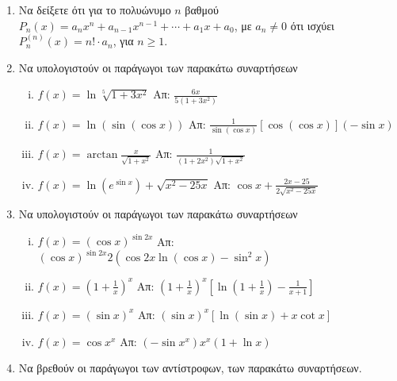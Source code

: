 \begin{enumerate}
  \item Να δείξετε ότι για το πολυώνυμο $n$ βαθμού $ P_{n}(x) =a_{n}x^{n} +
    a_{n-1}x^{n-1} + \cdots + a_{1}x + a_{0} $, με  $ a_{n}\neq 0 $ ότι ισχύει $
    P_{n}^{(n)}(x) = n! \cdot a_{n}$, για  $n\geq 1 $.

  \item Να υπολογιστούν οι παράγωγοι των παρακάτω συναρτήσεων
    \begin{enumerate}[(i)]
      \item $ f(x) = \ln{\sqrt[5]{1+3x^{2}}} $ \hfill Απ: $
        \frac{6x}{5(1+3x^{2})} $
      \item $ f(x) = \ln({\sin({\cos{x}})}) $ \hfill Απ: $
        \frac{1}{\sin{(\cos{x})}} [\cos{(\cos{x})}] (- \sin{x}) $ 
      \item $ f(x) = \arctan \frac{x}{\sqrt{1 + x^{2}}} $ \hfill Απ: $
        \frac{1}{(1+2x^{2})\sqrt{1 + x^{2}}} $
      \item $ f(x) = \ln{(e^{\sin{x}})} + \sqrt{x^{2} - 25x} $ \hfill Απ: $
        \cos{x} + \frac{2x - 25}{2 \sqrt{x^{2} - 25x}}  $  
    \end{enumerate}

  \item  Να υπολογιστούν οι παράγωγοι των παρακάτω συναρτήσεων

    \begin{enumerate}[(i)]
      \item $ f(x) = (\cos{x})^{\sin{2x}} $ \hfill Απ: $
        (\cos{x})^{\sin{2x}} 2(\cos{2x} \ln{(\cos{x})} - \sin^{2}{x}) $
      \item $ f(x) = \left(1 + \frac{1}{x} \right)^{x} $ \hfill Απ: $
        \left(1 + \frac{1}{x}\right)^{x}\left[\ln{(1 + \frac{1}{x})} -
        \frac{1}{x+1}\right] $
      \item $ f(x)=(\sin{x})^{x} $ \hfill Απ: $ (\sin{x})^{x}[\ln{(\sin{x}
        )} + x \cot{x}] $ 
      \item $ f(x)=\cos{x}^{x} $ \hfill Απ: $ (- \sin{x^{x}})x^{x} (1 +
        \ln{x}) $
    \end{enumerate}

  \item Να βρεθούν οι παράγωγοι των αντίστροφων, των παρακάτω συναρτήσεων.
    \begin{enumerate}[(i)]
    \end{enumerate}


\end{enumerate}
